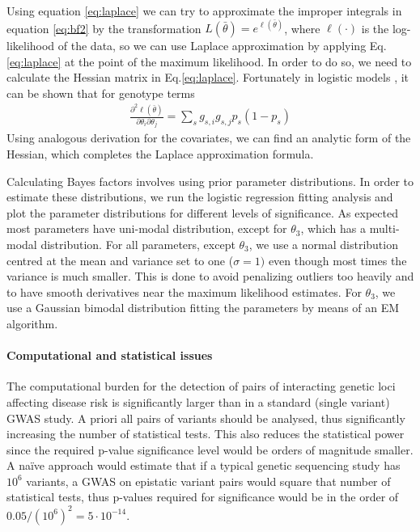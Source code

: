 Using equation \ref{eq:laplace} we can try to approximate the improper integrals in equation \ref{eq:bf2} by the transformation $L(\bar{\theta}) = e^{\ell(\bar{\theta})}$, where $\ell(\cdot)$ is the log-likelihood of the data, so we can use Laplace approximation by applying Eq.\ref{eq:laplace} at the point of the maximum likelihood.
In order to do so, we need to calculate the Hessian matrix in Eq.\ref{eq:laplace}.
Fortunately in logistic models
, it can be shown that for genotype terms
\begin{eqnarray*}
	\frac{ \partial^2 \ell(\bar{\theta}) }{ \partial\theta_i \partial\theta_j } 
	= \sum_s{ g_{s,i} g_{s,j} p_s (1-p_s) } 
\end{eqnarray*}
\noindent Using analogous derivation for the covariates, we can find an analytic form of the Hessian, which completes the Laplace approximation formula.

Calculating Bayes factors involves using prior parameter distributions. 
In order to estimate these distributions, we run the logistic regression fitting analysis and plot the parameter distributions for different levels of significance. 
As expected most parameters have uni-modal distribution, except for $\theta_3$, which has a multi-modal distribution. 
For all parameters, except $\theta_3$, we use a normal distribution centred at the mean and variance set to one ($\sigma=1)$ even though most times the variance is much smaller. 
This is done to avoid penalizing outliers too heavily and to have smooth derivatives near the maximum likelihood estimates. 
For $\theta_3$, we use a Gaussian bimodal distribution fitting the parameters by means of an EM algorithm.

\paragraph{Computational and statistical issues} 
The computational burden for the detection of pairs of interacting genetic loci affecting disease risk is significantly larger than in a standard (single variant) GWAS study. 
A priori all pairs of variants should be analysed, thus significantly increasing the number of statistical tests. 
This also reduces the statistical power since the required p-value significance level would be orders of magnitude smaller. 
A na{\"i}ve approach would estimate that if a typical genetic sequencing study has $10^6$ variants, a GWAS on epistatic variant pairs would square that number of statistical tests, thus p-values required for significance would be in the order of $0.05 / (10^6)^2 = 5 \cdot 10^{-14}$. 

